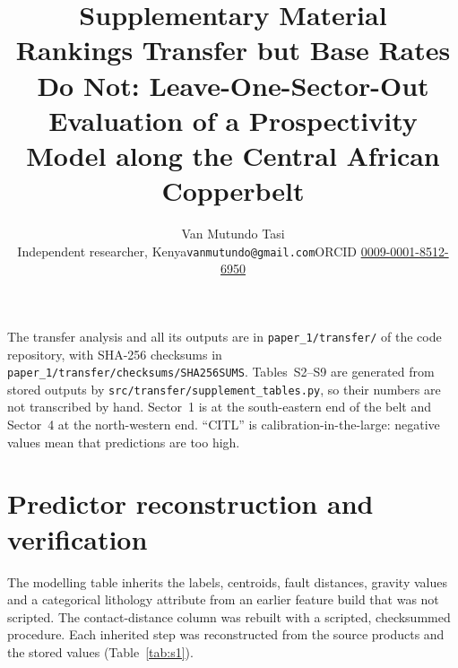 \documentclass[11pt]{article}
\title{Supplementary Material\\[0.3em]\large Rankings Transfer but Base Rates Do Not: Leave-One-Sector-Out Evaluation of a Prospectivity Model along the Central African Copperbelt}
\author{Van Mutundo Tasi\\[0.2em]\small Independent researcher, Kenya\quad\texttt{vanmutundo@gmail.com}\quad ORCID \href{https://orcid.org/0009-0001-8512-6950}{0009-0001-8512-6950}}
\date{}
\begin{document}
\maketitle

\setlength{\parindent}{0pt}
\setlength{\parskip}{0.5em}

The transfer analysis and all its outputs are in \texttt{paper\_1/transfer/} of the code repository, with SHA-256 checksums in \texttt{paper\_1/transfer/checksums/SHA256SUMS}. Tables~S2--S9 are generated from stored outputs by \texttt{src/transfer/supplement\_tables.py}, so their numbers are not transcribed by hand. Sector~1 is at the south-eastern end of the belt and Sector~4 at the north-western end. ``CITL'' is calibration-in-the-large: negative values mean that predictions are too high.

\section{Predictor reconstruction and verification}
\label{sec:s1}

The modelling table inherits the labels, centroids, fault distances, gravity values and a categorical lithology attribute from an earlier feature build that was not scripted. The contact-distance column was rebuilt with a scripted, checksummed procedure. Each inherited step was reconstructed from the source products and the stored values (Table~\ref{tab:s1}).
\end{document}
